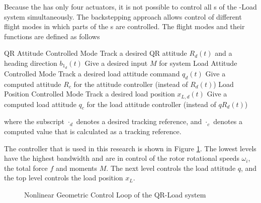 Because the  has only four actuators, it is not possible to control all s of the -Load system simultaneously. The backstepping approach allows control of different flight modes in which parts of the s are controlled. The flight modes and their functions are defined as follows
\begin{outline}
\1 QR Attitude Controlled Mode 
\2 Track a desired QR attitude $ R_d(t) $ and a heading direction $ b_{1_d}(t) $
\2 Give a desired input $ M $ for system
\1 Load Attitude Controlled Mode 
\2 Track a desired load attitude command $ q_d(t) $
\2 Give a computed  attitude $ R_c $ for the  attitude controller (instead of $ R_d(t) $)
\1 Load Position Controlled Mode
\2 Track a desired load position $ x_{L,d}(t) $
\2 Give a computed load attitude $ q_c $ for the load attitude controller (instead of $qR_d(t) $)
\end{outline}
where the subscript $ \cdot_d $ denotes a desired tracking reference, and $ \cdot_c $ denotes a computed value that is calculated as a tracking reference. 

The controller that is used in this research is shown in Figure \ref{fig:con.loop}. The lowest levels have the highest bandwidth and are in control of the rotor rotational speeds $ \omega_i $, the total force $ f $ and moments $ M $. The next level controls the load attitude $ q $, and the top level controls the load position $ x_L $. 
\begin{figure}[h!]
	\centering
	\caption{Nonlinear Geometric Control Loop of the QR-Load system \label{fig:con.loop}}
\end{figure}	

